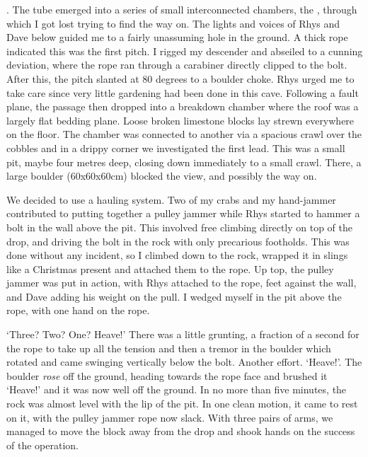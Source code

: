 	. The tube emerged into a series of small interconnected chambers, the , through which I got lost trying to find the way on. The lights and voices of Rhys and Dave below guided me to a fairly unassuming hole in the ground. A thick rope indicated this was the first pitch. I rigged my descender and abseiled to a cunning deviation, where the rope ran through a carabiner directly clipped to the bolt. After this, the pitch slanted at 80 degrees to a boulder choke. Rhys urged me to take care since very little gardening had been done in this cave. Following a fault plane, the passage then dropped into a breakdown chamber where the roof was a largely flat bedding plane. Loose broken limestone blocks lay strewn everywhere on the floor. The chamber was connected to another via a spacious crawl over the cobbles and in a drippy corner we investigated the first lead. This was a small pit, maybe four metres deep, closing down immediately to a small crawl. There, a large boulder (60x60x60cm) blocked the view, and possibly the way on. 

	We decided to use a hauling system. Two of my crabs and my hand-jammer contributed to putting together a pulley jammer while Rhys started to hammer a bolt in the wall above the pit. This involved free climbing directly on top of the drop, and driving the bolt in the rock with only precarious footholds. This was done without any incident, so I climbed down to the rock, wrapped it in slings like a Christmas present and attached them to the rope. Up top, the pulley jammer was put in action, with Rhys attached to the rope, feet against the wall, and Dave adding his weight on the pull. I wedged myself in the pit above the rope, with one hand on the rope. 

	`Three? Two? One? Heave!' There was a little grunting, a fraction of a second  for the rope to take up all the tension and then a tremor in the boulder which rotated and came swinging vertically below the bolt. Another effort. `Heave!'. The boulder \emph{rose} off the ground, heading towards the rope face and brushed it `Heave!' and it was now well off the ground. In no more than five minutes, the rock was almost level with the lip of the pit. In one clean motion, it came to rest on it, with the pulley jammer rope now slack. With three pairs of arms, we managed to move the block away from the drop and shook hands on the success of the operation. 

